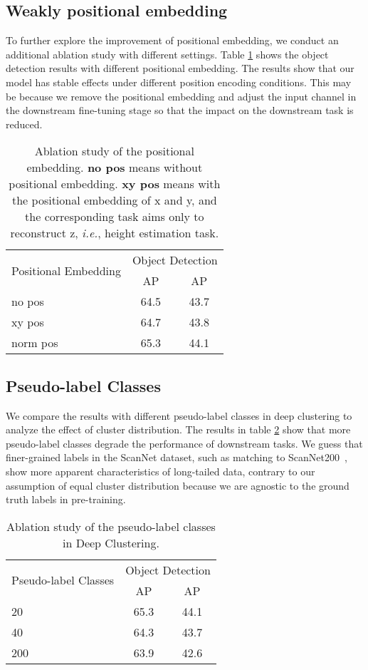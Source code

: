 \documentclass{article}
\def\ie{{\it{i.e.}}}
\begin{document}
\subsection{Weakly positional embedding}
To further explore the improvement of positional embedding, we conduct an additional ablation study with different settings. Table \ref{tab:pos} shows the object detection results with different positional embedding. 
The results show that our model has stable effects under different position encoding conditions. This may be because we remove the positional embedding and adjust the input channel in the downstream fine-tuning stage so that the impact on the downstream task is reduced.
\begin{table}[h!]
\centering
{
\begin{tabular}{lcc}
    \toprule
    \multirow{2}{*}{Positional Embedding} & \multicolumn{2}{c}{Object Detection} \\
    \cmidrule(r){2-3}
    & AP &  AP \\
    \midrule
    no pos & 64.5 & 43.7 \\
    xy pos & 64.7 & 43.8 \\
    \rowcolor{linecolor2}norm pos & 65.3 & 44.1 \\
    \bottomrule
\end{tabular}
}
\caption{Ablation study of the positional embedding. \textbf{no pos} means without positional embedding. \textbf{xy pos} means with the positional embedding of x and y, and the corresponding task aims only to reconstruct z, \ie, height estimation task.}
\label{tab:pos}
\end{table}
\subsection{Pseudo-label Classes}\label{app:add_eva}
We compare the results with different pseudo-label classes in deep clustering to analyze the effect of cluster distribution. The results in table \ref{tab:Pseudo-label} show that more pseudo-label classes degrade the performance of downstream tasks. We guess that finer-grained labels in the ScanNet dataset, such as matching to ScanNet200~\cite{Scannet200_22}, show more apparent characteristics of long-tailed data, contrary to our assumption of equal cluster distribution because we are agnostic to the ground truth labels in pre-training.
\begin{table}[h!]
\centering
{
\begin{tabular}{lcc}
    \toprule
    \multirow{2}{*}{Pseudo-label Classes} & \multicolumn{2}{c}{Object Detection} \\
    \cmidrule(r){2-3}
    & AP &  AP \\
    \midrule
    \rowcolor{linecolor2}20 & 65.3 & 44.1 \\
    40& 64.3 & 43.7 \\
    200 & 63.9 & 42.6\\
    \bottomrule
\end{tabular}
}
\caption{Ablation study of the pseudo-label classes in Deep Clustering.}
\label{tab:Pseudo-label}
\end{table}
\end{document}
